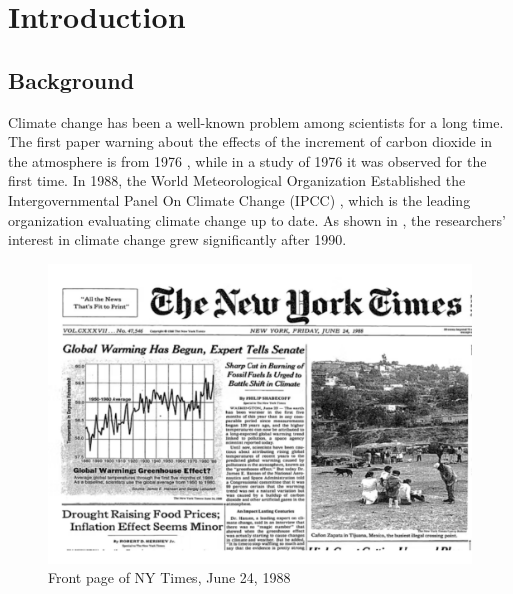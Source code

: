 
\chapter{Introduction}  %
\label{Introduction}

\ifpdf
    \graphicspath{{Chapter1/Figs/Raster/}{Chapter1/Figs/PDF/}{Chapter1/Figs/}}
\else
    \graphicspath{{Chapter1/Figs/Vector/}{Chapter1/Figs/}}
\fi
\section{Background}
Climate change has been a well-known problem among scientists for a long time. The first paper warning about the effects of the increment of carbon dioxide in the atmosphere is from 1976 \cite{manabe_thermal_1967}, while in a study of 1976 \cite{keeling_atmospheric_1976} it was observed for the first time. In 1988, the World Meteorological Organization Established the Intergovernmental Panel On Climate Change (IPCC) \cite{baker_1989}, which is the leading organization evaluating climate change up to date. As shown in \cite{santos_climate_2021}, the researchers' interest in climate change grew significantly after 1990. 

\begin{figure}[H]
    \centering
    \includegraphics[width=0.75\linewidth]{Chapter1/figures/global_warming copy.pdf}
    \caption{Front page of NY Times, June 24, 1988 }
    \label{fig:enter-label}
\end{figure}

